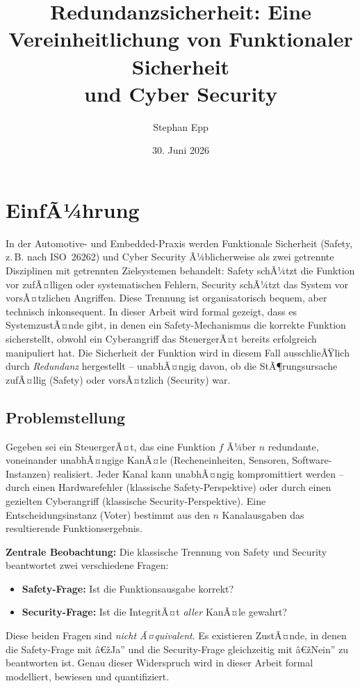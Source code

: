 ﻿\documentclass[a4paper,12pt]{article}
\title{Redundanzsicherheit: Eine Vereinheitlichung von Funktionaler Sicherheit\\ und Cyber Security}
\author{Stephan Epp}
\date{30. Juni 2026}
\theoremstyle{definition}
\begin{document}
\maketitle

\tableofcontents
\newpage

\section{EinfÃ¼hrung}

In der Automotive- und Embedded-Praxis werden Funktionale Sicherheit (Safety, z.\,B. nach ISO~26262) und Cyber Security Ã¼blicherweise als zwei getrennte Disziplinen mit getrennten Zielsystemen behandelt: Safety schÃ¼tzt die Funktion vor zufÃ¤lligen oder systematischen Fehlern, Security schÃ¼tzt das System vor vorsÃ¤tzlichen Angriffen. Diese Trennung ist organisatorisch bequem, aber technisch inkonsequent. In dieser Arbeit wird formal gezeigt, dass es SystemzustÃ¤nde gibt, in denen ein Safety-Mechanismus die korrekte Funktion sicherstellt, obwohl ein Cyberangriff das SteuergerÃ¤t bereits erfolgreich manipuliert hat. Die Sicherheit der Funktion wird in diesem Fall ausschlieÃŸlich durch \emph{Redundanz} hergestellt -- unabhÃ¤ngig davon, ob die StÃ¶rungsursache zufÃ¤llig (Safety) oder vorsÃ¤tzlich (Security) war.

\subsection{Problemstellung}

Gegeben sei ein SteuergerÃ¤t, das eine Funktion $f$ Ã¼ber $n$ redundante, voneinander unabhÃ¤ngige KanÃ¤le (Recheneinheiten, Sensoren, Software-Instanzen) realisiert. Jeder Kanal kann unabhÃ¤ngig kompromittiert werden -- durch einen Hardwarefehler (klassische Safety-Perspektive) oder durch einen gezielten Cyberangriff (klassische Security-Perspektive). Eine Entscheidungsinstanz (Voter) bestimmt aus den $n$ Kanalausgaben das resultierende Funktionsergebnis.

\textbf{Zentrale Beobachtung:} Die klassische Trennung von Safety und Security beantwortet zwei verschiedene Fragen:
\begin{itemize}
	\item \textbf{Safety-Frage:} Ist die Funktionsausgabe korrekt?
	\item \textbf{Security-Frage:} Ist die IntegritÃ¤t \emph{aller} KanÃ¤le gewahrt?
\end{itemize}

Diese beiden Fragen sind \emph{nicht Ã¤quivalent}. Es existieren ZustÃ¤nde, in denen die Safety-Frage mit â€žJa'' und die Security-Frage gleichzeitig mit â€žNein'' zu beantworten ist. Genau dieser Widerspruch wird in dieser Arbeit formal modelliert, bewiesen und quantifiziert.
\end{document}
